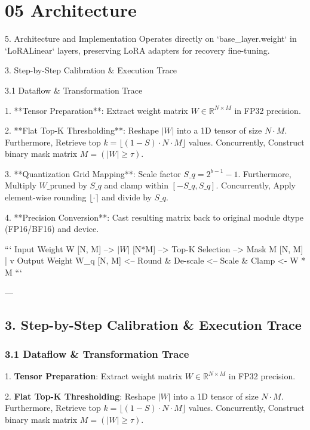 \section{05 Architecture}

 5. Architecture and Implementation
Operates directly on `base\_layer.weight` in `LoRALinear` layers, preserving LoRA adapters for recovery fine-tuning.


 3. Step-by-Step Calibration \& Execution Trace


 3.1 Dataflow \& Transformation Trace

1. **Tensor Preparation**:
Extract weight matrix $W \in \mathbb{R}^{N \times M}$ in FP32 precision.

2. **Flat Top-K Thresholding**:
Reshape $|W|$ into a 1D tensor of size $N \cdot M$. Furthermore, Retrieve top $k = \lfloor (1 - S) \cdot N \cdot M \rfloor$ values. Concurrently, Construct binary mask matrix $M = (|W| \ge \tau)$.

3. **Quantization Grid Mapping**:
Scale factor $S\_q = 2^{b-1} - 1$. Furthermore, Multiply $W\_{\text{pruned}}$ by $S\_q$ and clamp within $[-S\_q, S\_q]$. Concurrently, Apply element-wise rounding $\lfloor \cdot \rceil$ and divide by $S\_q$.

4. **Precision Conversion**:
Cast resulting matrix back to original module dtype (FP16/BF16) and device.


```
Input Weight W [N, M] --> $|W|$ [N*M] --> Top-K Selection --> Mask M [N, M]
                                                                  |
                                                                  v
Output Weight W\_q [N, M] <-- Round \& De-scale <-- Scale \& Clamp <- W * M
```

---



\subsection{3. Step-by-Step Calibration \& Execution Trace}
\subsubsection{3.1 Dataflow \& Transformation Trace}

1. \textbf{Tensor Preparation}:
Extract weight matrix $W \in \mathbb{R}^{N \times M}$ in FP32 precision.

2. \textbf{Flat Top-K Thresholding}:
Reshape $|W|$ into a 1D tensor of size $N \cdot M$. Furthermore, Retrieve top $k = \lfloor (1 - S) \cdot N \cdot M \rfloor$ values. Concurrently, Construct binary mask matrix $M = (|W| \ge \tau)$.

